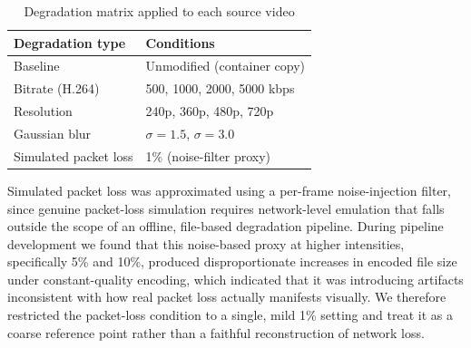 \documentclass[conference]{IEEEtran}
\begin{document}
\begin{table}[htbp]
\caption{Degradation matrix applied to each source video}
\label{tab:degradation_matrix}
\centering
\begin{tabular}{@{}ll@{}}
\toprule
\textbf{Degradation type} & \textbf{Conditions} \\
\midrule
Baseline & Unmodified (container copy) \\
Bitrate (H.264) & 500, 1000, 2000, 5000 kbps \\
Resolution & 240p, 360p, 480p, 720p \\
Gaussian blur & $\sigma = 1.5$, $\sigma = 3.0$ \\
Simulated packet loss & 1\% (noise-filter proxy) \\
\bottomrule
\end{tabular}
\end{table}

Simulated packet loss was approximated using a per-frame noise-injection filter, since genuine packet-loss simulation requires network-level emulation that falls outside the scope of an offline, file-based degradation pipeline. During pipeline development we found that this noise-based proxy at higher intensities, specifically 5\% and 10\%, produced disproportionate increases in encoded file size under constant-quality encoding, which indicated that it was introducing artifacts inconsistent with how real packet loss actually manifests visually. We therefore restricted the packet-loss condition to a single, mild 1\% setting and treat it as a coarse reference point rather than a faithful reconstruction of network loss.
\end{document}
